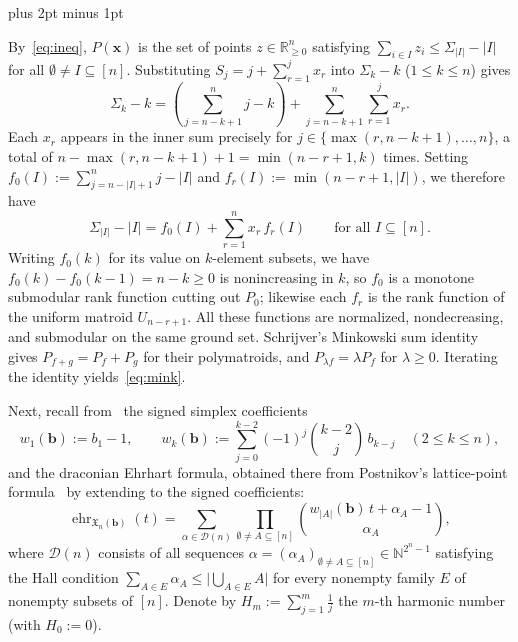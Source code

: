 \documentclass[11pt,letterpaper]{article}
\makeatletter
\renewenvironment{proof}[1][\proofname]{%
  \par\pushQED{\qed}\normalfont
  \topsep9pt plus 2pt minus 1pt\relax
  \trivlist\item[\hskip\labelsep\itshape #1\@addpunct{.}]\ignorespaces
}{\popQED\endtrivlist\@endpefalse}
\theoremstyle{result}
\theoremstyle{remark}
\newcommand{\NN}{\mathbb{N}}
\newcommand{\RR}{\mathbb{R}}
\newcommand{\X}{\mathfrak{X}}
\newcommand{\vb}{\mathbf{b}}
\newcommand{\vx}{\mathbf{x}}
\newcommand{\ehr}{\operatorname{ehr}}
\makeatother
\begin{document}
\begin{proof}
By~\eqref{eq:ineq}, $P(\vx)$ is the set of points $z\in\RR_{\ge 0}^n$ satisfying $\sum_{i\in I} z_i \le \Sigma_{|I|}-|I|$ for all $\emptyset\ne I\subseteq[n]$. Substituting $S_j=j+\sum_{r=1}^j x_r$ into $\Sigma_k-k$ ($1\le k\le n$) gives
\[
\Sigma_k - k = \left(\sum_{j=n-k+1}^n j - k\right) + \sum_{j=n-k+1}^n \sum_{r=1}^j x_r.
\]
Each $x_r$ appears in the inner sum precisely for $j\in\{\max(r,n-k+1),\dots,n\}$, a total of $n-\max(r,n-k+1)+1=\min(n-r+1,k)$ times. Setting $f_0(I):=\sum_{j=n-|I|+1}^n j - |I|$ and $f_r(I):=\min(n-r+1,|I|)$, we therefore have
\[
\Sigma_{|I|}-|I| = f_0(I) + \sum_{r=1}^n x_r\, f_r(I)
\qquad\text{for all } I\subseteq[n].
\]
Writing $f_0(k)$ for its value on $k$-element subsets, we have $f_0(k)-f_0(k-1)=n-k\ge 0$ is nonincreasing in $k$, so $f_0$ is a monotone submodular rank function cutting out $P_0$; likewise each $f_r$ is the rank function of the uniform matroid $U_{n-r+1}$. All these functions are normalized, nondecreasing, and submodular on the same ground set. Schrijver's Minkowski sum identity~\cite[p.~781, Theorem~44.6]{Sch03} gives $P_{f+g}=P_f+P_g$ for their polymatroids, and $P_{\lambda f}=\lambda P_f$ for $\lambda\ge 0$. Iterating the identity yields~\eqref{eq:mink}.
\end{proof}

Next, recall from~\cite[Section~5 and Theorem~5.9]{HLTV26} the signed simplex coefficients
\begin{equation}\label{eq:wk}
w_1(\vb) := b_1 - 1,
\qquad
w_k(\vb) := \sum_{j=0}^{k-2}(-1)^j\binom{k-2}{j}\, b_{k-j} \quad (2\le k\le n),
\end{equation}
and the draconian Ehrhart formula, obtained there from Postnikov's lattice-point formula~\cite[Theorem~11.3]{Pos09} by extending to the signed coefficients:
\begin{equation}\label{eq:thm59}
\ehr_{\X_n(\vb)}(t) = \sum_{\alpha\in\mathcal{D}(n)} \prod_{\emptyset\ne A\subseteq[n]} \binom{w_{|A|}(\vb)\,t + \alpha_A - 1}{\alpha_A},
\end{equation}
where $\mathcal{D}(n)$ consists of all sequences $\alpha=(\alpha_A)_{\emptyset\ne A\subseteq[n]}\in\NN^{2^n-1}$ satisfying the Hall condition $\sum_{A\in E}\alpha_A\le \bigl|\bigcup_{A\in E} A\bigr|$ for every nonempty family $E$ of nonempty subsets of $[n]$. Denote by $H_m:=\sum_{j=1}^m\frac{1}{j}$ the $m$-th harmonic number (with $H_0:=0$).
\end{document}
